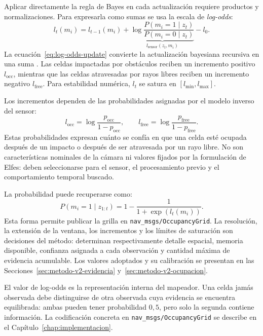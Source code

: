 Aplicar directamente la regla de Bayes en cada actualización requiere productos y
normalizaciones. Para expresarla como sumas se usa la escala de
\emph{log-odds}:
\begin{equation}
  l_t(m_i) =
  l_{t-1}(m_i) +
  \underbrace{\log\frac{P(m_i=1\mid z_t)}{P(m_i=0\mid z_t)}}_{l_{\text{sensor}}(z_t,m_i)}
  - l_0.
  \label{eq:log-odds-update}
\end{equation}
La ecuación~\ref{eq:log-odds-update} convierte la actualización bayesiana recursiva en una
suma
\cite{Thrun2005}. Las celdas impactadas por obstáculos reciben un incremento positivo
$l_{\text{occ}}$, mientras que las celdas atravesadas por rayos libres reciben un incremento
negativo $l_{\text{free}}$. Para estabilidad numérica, $l_t$ se satura en
$[l_{\min},l_{\max}]$.

Los incrementos dependen de las probabilidades asignadas por el modelo inverso del sensor:
\begin{equation}
  l_{\mathrm{occ}}=\log\frac{p_{\mathrm{occ}}}{1-p_{\mathrm{occ}}},
  \qquad
  l_{\mathrm{free}}=\log\frac{p_{\mathrm{free}}}{1-p_{\mathrm{free}}}.
  \label{eq:inverse-sensor-log-odds}
\end{equation}
Estas probabilidades expresan cuánto se confía en que una celda esté ocupada después de un
impacto o después de ser atravesada por un rayo libre. No son características nominales de la
cámara ni valores fijados por la formulación de Elfes: deben seleccionarse para el sensor, el
procesamiento previo y el comportamiento temporal buscado.

La probabilidad puede recuperarse como:
\begin{equation}
  P(m_i=1\mid z_{1:t}) =
  1-\frac{1}{1+\exp(l_t(m_i))}.
  \label{eq:log-odds-prob}
\end{equation}
Esta forma permite publicar la grilla en \texttt{nav\_msgs/OccupancyGrid}. La resolución, la
extensión de la ventana, los incrementos y los límites de saturación son decisiones del método:
determinan respectivamente detalle espacial, memoria disponible, confianza asignada a cada
observación y cantidad máxima de evidencia acumulable. Los valores adoptados y su calibración se
presentan en las Secciones~\ref{sec:metodo-v2-evidencia} y~\ref{sec:metodo-v2-ocupacion}.

El valor de log-odds es la representación interna del mapeador. Una celda jamás observada debe
distinguirse de otra observada cuya evidencia se encuentra equilibrada: ambas pueden tener
probabilidad $0{,}5$, pero solo la segunda contiene información. La codificación concreta en
\texttt{nav\_msgs/OccupancyGrid} se describe en el Capítulo~\ref{chap:implementacion}.

